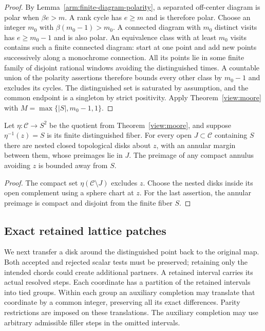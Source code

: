 \begin{proof}
By Lemma~\ref{arm:finite-diagram-polarity}, a separated off-center diagram
is polar when $\beta e>m$.  A rank cycle has $e\ge m$ and is therefore polar.
Choose an integer $m_0$ with $\beta(m_0-1)>m_0$.  A connected diagram with
$m_0$ distinct visits has $e\ge m_0-1$ and is also polar.  An equivalence
class with at least $m_0$ visits contains such a finite connected diagram:
start at one point and add new points successively along a monochrome
connection.  All its points lie in some finite family of disjoint rational
windows avoiding the distinguished times.  A countable union of the
polarity assertions therefore bounds every other class by $m_0-1$ and
excludes its cycles.  The distinguished set is saturated by assumption,
and the common endpoint is a singleton by strict positivity.  Apply
Theorem~\ref{view:moore} with
$M=\max\{|S|,m_0-1,1\}$.
\end{proof}

\begin{lemma}\label{view:annulus-preimage}
Let $\eta:\mathcal C\to S^2$ be the quotient from
Theorem~\ref{view:moore}, and suppose $\eta^{-1}(z)=S$ is its finite
distinguished fiber.  For every open $J\subset\mathcal C$ containing $S$
there are nested closed topological disks about $z$, with an annular
margin between them, whose preimages lie in $J$.  The preimage of any
compact annulus avoiding $z$ is bounded away from $S$.
\end{lemma}

\begin{proof}
The compact set $\eta(\mathcal C\setminus J)$ excludes $z$.  Choose the
nested disks inside its open complement using a sphere chart at $z$.
For the last assertion, the annular preimage is compact and disjoint from
the finite fiber $S$.
\end{proof}

\subsection{Exact retained lattice patches}

We next transfer a disk around the distinguished point back to the
original map.  Both accepted and rejected scalar tests must be preserved;
retaining only the intended chords could create additional partners.
A retained interval carries its actual resolved steps.  Each
coordinate has a partition of the retained intervals into tied groups.
Within each group an auxiliary completion may translate that coordinate
by a common integer, preserving all its exact differences.  Parity
restrictions are imposed on these translations.  The auxiliary completion
may use arbitrary admissible filler steps in the omitted intervals.

